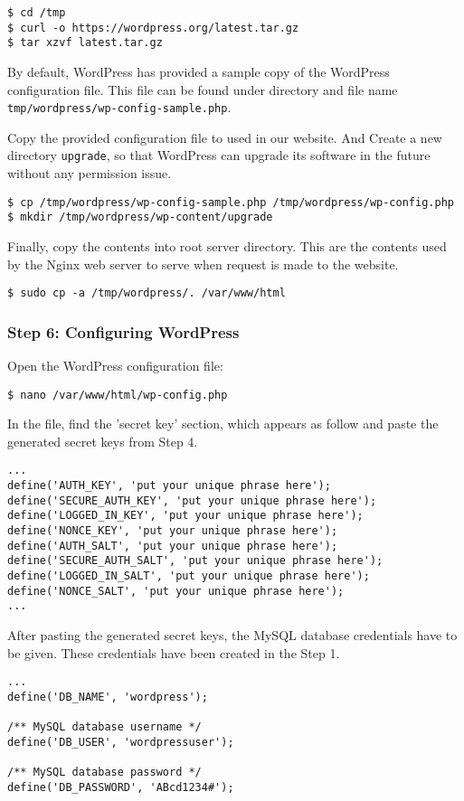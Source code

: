 \begin{lstlisting}
$ cd /tmp
$ curl -o https://wordpress.org/latest.tar.gz
$ tar xzvf latest.tar.gz
\end{lstlisting}

By default, WordPress has provided a sample copy of the WordPress configuration file. This file can be found under directory and file name \texttt{tmp/wordpress/wp-config-sample.php}.

Copy the provided configuration file to used in our website. And Create a new directory \texttt{upgrade}, so that WordPress can upgrade its software in the future without any permission issue.
\begin{lstlisting}
$ cp /tmp/wordpress/wp-config-sample.php /tmp/wordpress/wp-config.php
$ mkdir /tmp/wordpress/wp-content/upgrade
\end{lstlisting}

Finally, copy the contents into root server directory. This are the contents used by the Nginx web server to serve when request is made to the website.
\begin{lstlisting}
$ sudo cp -a /tmp/wordpress/. /var/www/html
\end{lstlisting}

\subsubsection*{Step 6: Configuring WordPress}
Open the WordPress configuration file:
\begin{lstlisting}
$ nano /var/www/html/wp-config.php
\end{lstlisting}

In the file, find the 'secret key' section, which appears as follow and paste the generated secret keys from Step 4.
\begin{lstlisting}
...
define('AUTH_KEY', 'put your unique phrase here');
define('SECURE_AUTH_KEY', 'put your unique phrase here');
define('LOGGED_IN_KEY', 'put your unique phrase here');
define('NONCE_KEY', 'put your unique phrase here');
define('AUTH_SALT', 'put your unique phrase here');
define('SECURE_AUTH_SALT', 'put your unique phrase here');
define('LOGGED_IN_SALT', 'put your unique phrase here');
define('NONCE_SALT', 'put your unique phrase here');
...
\end{lstlisting}


After pasting the generated secret keys, the MySQL database credentials have to be given. These credentials have been created in the Step 1.
\begin{lstlisting}
...
define('DB_NAME', 'wordpress');

/** MySQL database username */
define('DB_USER', 'wordpressuser');

/** MySQL database password */
define('DB_PASSWORD', 'ABcd1234#');
\end{lstlisting}

